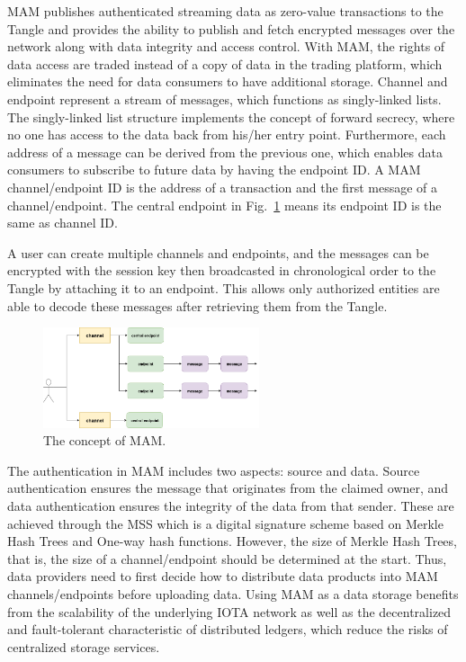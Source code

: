 \documentclass[conference]{IEEEtran}
\begin{document}
MAM publishes authenticated streaming data as zero-value transactions to the Tangle and provides the ability to publish and fetch encrypted messages over the network along with data integrity and access control. With MAM, the rights of data access are traded instead of a copy of data in the trading platform, which eliminates the need for data consumers to have additional storage. Channel and endpoint represent a stream of messages, which functions as singly-linked lists. The singly-linked list structure implements the concept of forward secrecy, where no one has access to the data back from his/her entry point. Furthermore, each address of a message can be derived from the previous one, which enables data consumers to subscribe to future data by having the endpoint ID. A MAM channel/endpoint ID is the address of a transaction and the first message of a channel/endpoint. The central endpoint in Fig.~\ref{fig:mam_struct} means its endpoint ID is the same as channel ID. 

A user can create multiple channels and endpoints, and the messages can be encrypted with the session key then broadcasted in chronological order to the Tangle by attaching it to an endpoint. This allows only authorized entities are able to decode these messages after retrieving them from the Tangle. 

\begin{figure}[!t]
    \centering
    \includegraphics[width=2.5in]{mam_struct}
    \caption{The concept of MAM.}
    \label{fig:mam_struct}
\end{figure}

The authentication in MAM includes two aspects: source and data. Source authentication ensures the message that originates from the claimed owner, and data authentication ensures the integrity of the data from that sender. These are achieved through the MSS which is a digital signature scheme based on Merkle Hash Trees and One-way hash functions. However, the size of Merkle Hash Trees, that is, the size of a channel/endpoint should be determined at the start. Thus, data providers need to first decide how to distribute data products into MAM channels/endpoints before uploading data. Using MAM as a data storage benefits from the scalability of the underlying IOTA network as well as the decentralized and fault-tolerant characteristic of distributed ledgers, which reduce the risks of centralized storage services. 
\end{document}
